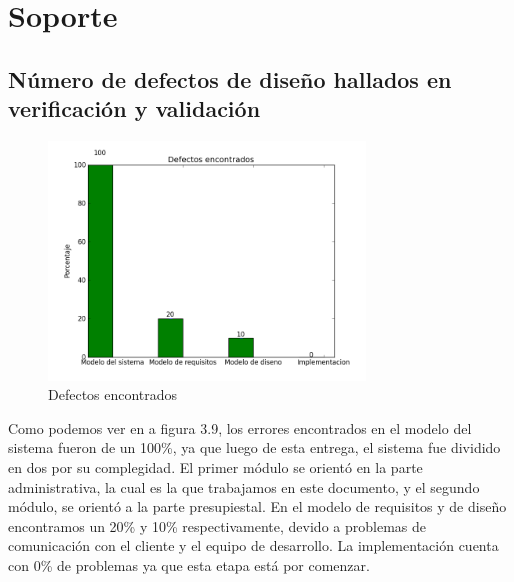 \documentclass[12pt,oneside,letterpaper]{report}
\begin{document}
\section{Soporte}

\subsection{Número de defectos de diseño hallados en verificación y validación}

\begin{figure}[h!]
  \centering
    \includegraphics[width=0.75\textwidth]{./img/barras/barras.png}
  \caption{Defectos encontrados}
\end{figure}

\maketitle Como podemos ver en a figura 3.9, los errores encontrados en el modelo del sistema fueron de un 100\%, ya que luego de esta entrega, el sistema fue dividido en dos por su complegidad. El primer módulo se orientó en la parte administrativa, la cual es la que trabajamos en este documento, y el segundo módulo, se orientó a la parte presupiestal. En el modelo de requisitos y de diseño encontramos un 20\% y 10\% respectivamente, devido a problemas de comunicación con el cliente y el equipo de desarrollo. La implementación cuenta con 0\% de problemas ya que esta etapa está por comenzar.
\end{document}
